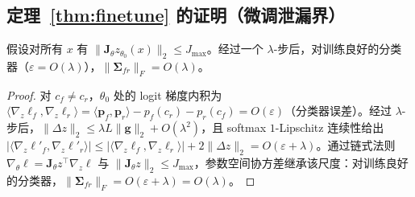 \subsection{定理~\ref{thm:finetune} 的证明（微调泄漏界）}
\label{app:finetune}

\begin{lemma}[交叉协方差界]
\label{lem:cross_cov}
假设对所有 $x$ 有 $\|\mathbf{J}_\theta z_{\theta_0}(x)\|_2 \le J_{\max}$。经过一个 $\lambda$-步后，对训练良好的分类器（$\varepsilon=O(\lambda)$），$\|\boldsymbol{\Sigma}_{fr}\|_F = O(\lambda)$。
\end{lemma}
\begin{proof}
对 $c_f\neq c_r$，$\theta_0$ 处的 logit 梯度内积为 $\langle\nabla_z\ell_f,\nabla_z\ell_r\rangle=\langle\mathbf{p}_f,\mathbf{p}_r\rangle-p_f(c_r)-p_r(c_f)=O(\varepsilon)$（分类器误差）。经过 $\lambda$-步后，$\|\Delta z\|_2\le\lambda L\|\mathbf{g}\|_2+O(\lambda^2)$，且 softmax $1$-Lipschitz 连续性给出 $|\langle\nabla_z\ell'_f,\nabla_z\ell'_r\rangle|\le|\langle\nabla_z\ell_f,\nabla_z\ell_r\rangle|+2\|\Delta z\|_2=O(\varepsilon+\lambda)$。通过链式法则 $\nabla_\theta\ell=\mathbf{J}_\theta z^\top\nabla_z\ell$ 与 $\|\mathbf{J}_\theta z\|_2\le J_{\max}$，参数空间协方差继承该尺度：对训练良好的分类器，$\|\boldsymbol{\Sigma}_{fr}\|_F=O(\varepsilon+\lambda)=O(\lambda)$。
\end{proof}

